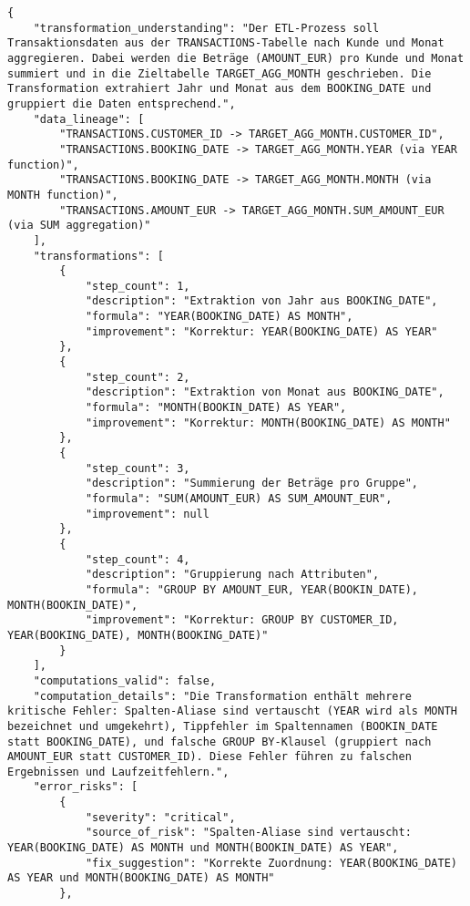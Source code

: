 \begin{lstlisting}[caption={Ausgabe: Claude Sonnet 4 Anwendungsfall 1 Robustheitsdurchlauf},label={claude_case1_prompt3}]
{
    "transformation_understanding": "Der ETL-Prozess soll Transaktionsdaten aus der TRANSACTIONS-Tabelle nach Kunde und Monat aggregieren. Dabei werden die Beträge (AMOUNT_EUR) pro Kunde und Monat summiert und in die Zieltabelle TARGET_AGG_MONTH geschrieben. Die Transformation extrahiert Jahr und Monat aus dem BOOKING_DATE und gruppiert die Daten entsprechend.",
    "data_lineage": [
        "TRANSACTIONS.CUSTOMER_ID -> TARGET_AGG_MONTH.CUSTOMER_ID",
        "TRANSACTIONS.BOOKING_DATE -> TARGET_AGG_MONTH.YEAR (via YEAR function)",
        "TRANSACTIONS.BOOKING_DATE -> TARGET_AGG_MONTH.MONTH (via MONTH function)",
        "TRANSACTIONS.AMOUNT_EUR -> TARGET_AGG_MONTH.SUM_AMOUNT_EUR (via SUM aggregation)"
    ],
    "transformations": [
        {
            "step_count": 1,
            "description": "Extraktion von Jahr aus BOOKING_DATE",
            "formula": "YEAR(BOOKING_DATE) AS MONTH",
            "improvement": "Korrektur: YEAR(BOOKING_DATE) AS YEAR"
        },
        {
            "step_count": 2,
            "description": "Extraktion von Monat aus BOOKING_DATE",
            "formula": "MONTH(BOOKIN_DATE) AS YEAR",
            "improvement": "Korrektur: MONTH(BOOKING_DATE) AS MONTH"
        },
        {
            "step_count": 3,
            "description": "Summierung der Beträge pro Gruppe",
            "formula": "SUM(AMOUNT_EUR) AS SUM_AMOUNT_EUR",
            "improvement": null
        },
        {
            "step_count": 4,
            "description": "Gruppierung nach Attributen",
            "formula": "GROUP BY AMOUNT_EUR, YEAR(BOOKIN_DATE), MONTH(BOOKIN_DATE)",
            "improvement": "Korrektur: GROUP BY CUSTOMER_ID, YEAR(BOOKING_DATE), MONTH(BOOKING_DATE)"
        }
    ],
    "computations_valid": false,
    "computation_details": "Die Transformation enthält mehrere kritische Fehler: Spalten-Aliase sind vertauscht (YEAR wird als MONTH bezeichnet und umgekehrt), Tippfehler im Spaltennamen (BOOKIN_DATE statt BOOKING_DATE), und falsche GROUP BY-Klausel (gruppiert nach AMOUNT_EUR statt CUSTOMER_ID). Diese Fehler führen zu falschen Ergebnissen und Laufzeitfehlern.",
    "error_risks": [
        {
            "severity": "critical",
            "source_of_risk": "Spalten-Aliase sind vertauscht: YEAR(BOOKING_DATE) AS MONTH und MONTH(BOOKIN_DATE) AS YEAR",
            "fix_suggestion": "Korrekte Zuordnung: YEAR(BOOKING_DATE) AS YEAR und MONTH(BOOKING_DATE) AS MONTH"
        },

\end{lstlisting}
